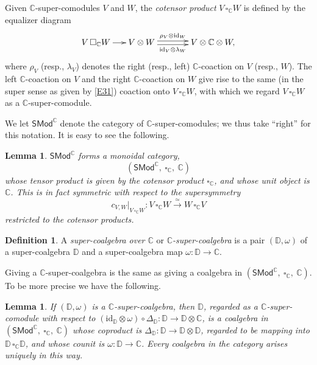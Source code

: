 \documentclass[11pt, a4paper]{amsart}
\newtheorem{lemma}[theorem]{Lemma}
\theoremstyle{definition}
\newtheorem{definition}[theorem]{Definition}
\numberwithin{equation}{section}
\begin{document}
Given $\mathbb{C}$-super-comodules $V$ and $W$, the \emph{cotensor product} $V\, \square_{\mathbb{C}} W$ is defined by the equalizer diagram
\[
\xymatrix@C=15pt{
V\, \square_{\mathbb{C}} W \ar[r] & V \otimes W \ar@<0.5ex>[rr]^-{\rho_{V} \otimes \mathrm{id}_{W}} \ar@<-0.5ex>[rr]_-{\mathrm{id}_{V} \otimes \lambda_{W}} & & V \otimes \mathbb{C} \otimes W,
}
\]
where $\rho_{V}$ (resp., $\lambda_{V}$) denotes the right (resp., left) $\mathbb{C}$-coaction on $V$ (resp., $W$).
The left $\mathbb{C}$-coaction on $V$ and the right $\mathbb{C}$-coaction on $W$ give rise to the same (in the super sense as given by \eqref{E31}) coaction onto $V\, \square_{\mathbb{C}} W$, with which we regard 
$V\, \square_{\mathbb{C}} W$ as a $\mathbb{C}$-super-comodule.

We let $\mathsf{SMod}^{\mathbb{C}}$ denote the category of $\mathbb{C}$-super-comodules; we thus take ``right'' for this notation.
It is easy to see the following.
\begin{lemma}\label{L31}
$\mathsf{SMod}^{\mathbb{C}}$ forms a monoidal category,
\[ (\mathsf{SMod}^{\mathbb{C}},\ \square_{\mathbb{C}},\ \mathbb{C}) \]
whose tensor product is given by the cotensor product $\square_{\mathbb{C}}$, and whose unit object is $\mathbb{C}$.
This is in fact symmetric with respect to the supersymmetry
\[ {c_{V, W}|}_{V\, \square_{\mathbb{C}} W}: V\, \square_{\mathbb{C}} W \overset{\simeq}{\longrightarrow} W\, \square_{\mathbb{C}} V \]
restricted to the cotensor products.
\end{lemma}
\begin{definition}\label{D31}
A \emph{super-coalgebra over $\mathbb{C}$} or \emph{$\mathbb{C}$-super-coalgebra} is a pair $(\mathbb{D}, \omega)$ of a super-coalgebra $\mathbb{D}$ and a super-coalgebra map $\omega: \mathbb{D} \to \mathbb{C}$.
\end{definition}

Giving a $\mathbb{C}$-super-coalgebra is the same as giving a coalgebra in $(\mathsf{SMod}^{\mathbb{C}},\ \square_{\mathbb{C}},\ \mathbb{C})$.
To be more precise we have the following.
\begin{lemma}\label{L32}
If $(\mathbb{D}, \omega)$ is a $\mathbb{C}$-super-coalgebra, then $\mathbb{D}$, regarded as a $\mathbb{C}$-super-comodule with respect to $(\mathrm{id}_{\mathbb{D}} \otimes \omega) \circ \Delta_{\mathbb{D}}: \mathbb{D} \to \mathbb{D} \otimes \mathbb{C}$, is a coalgebra in $(\mathsf{SMod}^{\mathbb{C}},\ \square_{\mathbb{C}},\ \mathbb{C})$ 
whose coproduct is $\Delta_{\mathbb{D}}: \mathbb{D} \to \mathbb{D} \otimes \mathbb{D}$, regarded to be mapping into $\mathbb{D}\, \square_{\mathbb{C}} \mathbb{D}$, and whose counit  is $\omega: \mathbb{D} \to \mathbb{C}$.
Every coalgebra in the category arises uniquely in this way.
\end{lemma}
\end{document}
